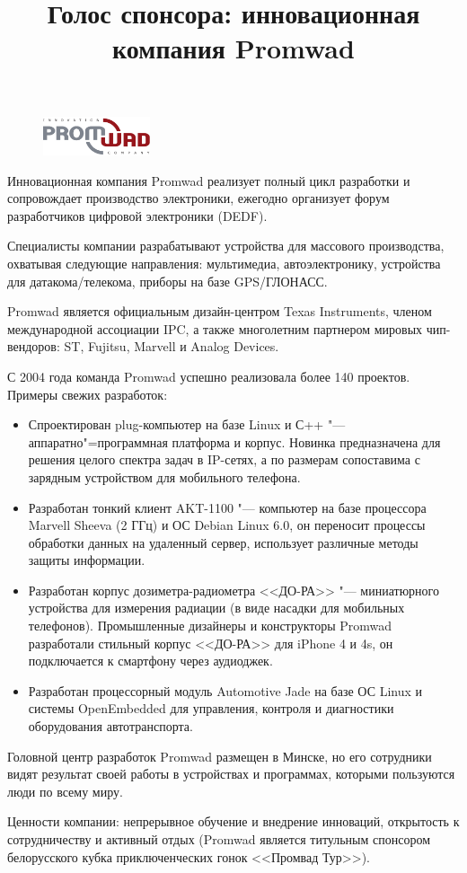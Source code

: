 \documentclass[10pt, a5paper]{article}
\begin{document}
\title{Голос спонсора: инновационная компания Promwad}
\date{}
\maketitle
\begin{figure}
\begin{center}
\includegraphics[width=0.28\textwidth]{53_spons_promwad.pdf}
\end{center}
\end{figure}
Инновационная компания Promwad реализует полный цикл разработки и сопровождает
производство электроники, ежегодно организует форум разработчиков цифровой
электроники (DEDF).

Специалисты компании разрабатывают устройства для массового производства,
охватывая следующие направления: мультимедиа, автоэлектронику, устройства для
датакома/телекома, приборы на базе GPS/ГЛОНАСС.

Promwad является официальным дизайн-центром Texas Instruments, членом
международной ассоциации IPC, а также многолетним партнером мировых
чип-вендоров: ST, Fujitsu, Marvell и Analog Devices.

С 2004 года команда Promwad успешно реализовала более 140 проектов. Примеры
свежих разработок:
\begin{itemize}
\item Спроектирован plug-компьютер на базе Linux и С++ "--- аппаратно"=программная
платформа и корпус. Новинка предназначена для решения целого спектра задач в
IP-сетях, а по размерам сопоставима с зарядным устройством для мобильного
телефона.
\item Разработан тонкий клиент AKT-1100 "--- компьютер на базе процессора Marvell Sheeva
(2 ГГц) и ОС Debian Linux 6.0, он переносит процессы обработки данных на
удаленный сервер, использует различные методы защиты информации.
\item Разработан корпус дозиметра-радиометра <<ДО-РА>> "---  миниатюрного
устройства для измерения радиации (в виде насадки для мобильных телефонов).
Промышленные дизайнеры и конструкторы Promwad разработали стильный корпус
<<ДО-РА>> для iPhone 4 и 4s, он подключается к смартфону через аудиоджек.
\item Разработан процессорный модуль Automotive Jade на базе ОС Linux и системы
OpenEmbedded для управления, контроля и диагностики оборудования
автотранспорта.
\end{itemize}
Головной центр разработок Promwad размещен в Минске, но его сотрудники видят
результат своей работы в устройствах и программах, которыми пользуются люди по
всему миру.

Ценности компании: непрерывное обучение и внедрение инноваций, открытость к
сотрудничеству и активный отдых (Promwad является титульным спонсором
белорусского кубка приключенческих гонок <<Промвад Тур>>).
\end{document}
